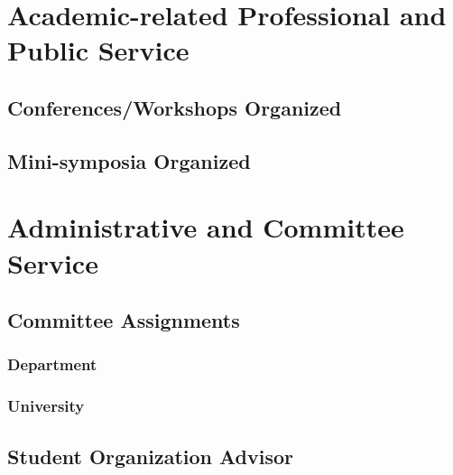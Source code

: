 \section*{Academic-related Professional and Public Service}

\subsection*{Conferences/Workshops Organized}

\subsection*{Mini-symposia Organized}


\section*{Administrative and Committee Service}
\subsection*{Committee Assignments}
\subsubsection*{Department}

\subsubsection*{University}

\subsection*{Student Organization Advisor}
